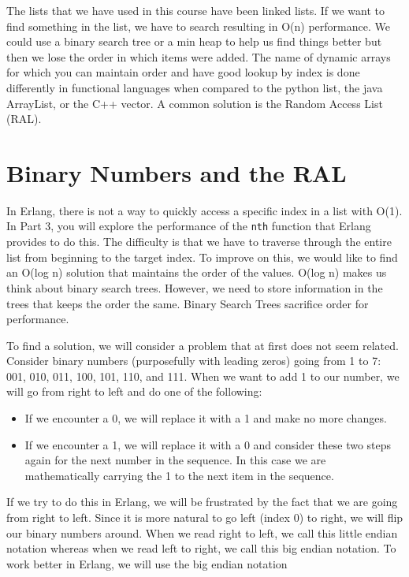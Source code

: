 \documentclass[
]{book}
\providecommand{\tightlist}{%
  \setlength{\itemsep}{0pt}\setlength{\parskip}{0pt}}
\begin{document}
The lists that we have used in this course have been linked lists. If we want to find something in the list, we have to search resulting in O(n) performance. We could use a binary search tree or a min heap to help us find things better but then we lose the order in which items were added. The name of dynamic arrays for which you can maintain order and have good lookup by index is done differently in functional languages when compared to the python list, the java ArrayList, or the C++ vector. A common solution is the Random Access List (RAL).

\hypertarget{binary-numbers-and-the-ral}{%
\section{Binary Numbers and the RAL}\label{binary-numbers-and-the-ral}}

In Erlang, there is not a way to quickly access a specific index in a list with O(1). In Part 3, you will explore the performance of the \texttt{nth} function that Erlang provides to do this. The difficulty is that we have to traverse through the entire list from beginning to the target index. To improve on this, we would like to find an O(log n) solution that maintains the order of the values. O(log n) makes us think about binary search trees. However, we need to store information in the trees that keeps the order the same. Binary Search Trees sacrifice order for performance.

To find a solution, we will consider a problem that at first does not seem related. Consider binary numbers (purposefully with leading zeros) going from 1 to 7: 001, 010, 011, 100, 101, 110, and 111. When we want to add 1 to our number, we will go from right to left and do one of the following:

\begin{itemize}
\tightlist
\item
  If we encounter a 0, we will replace it with a 1 and make no more changes.
\item
  If we encounter a 1, we will replace it with a 0 and consider these two steps again for the next number in the sequence. In this case we are mathematically carrying the 1 to the next item in the sequence.
\end{itemize}

If we try to do this in Erlang, we will be frustrated by the fact that we are going from right to left. Since it is more natural to go left (index 0) to right, we will flip our binary numbers around. When we read right to left, we call this little endian notation whereas when we read left to right, we call this big endian notation. To work better in Erlang, we will use the big endian notation
\end{document}
